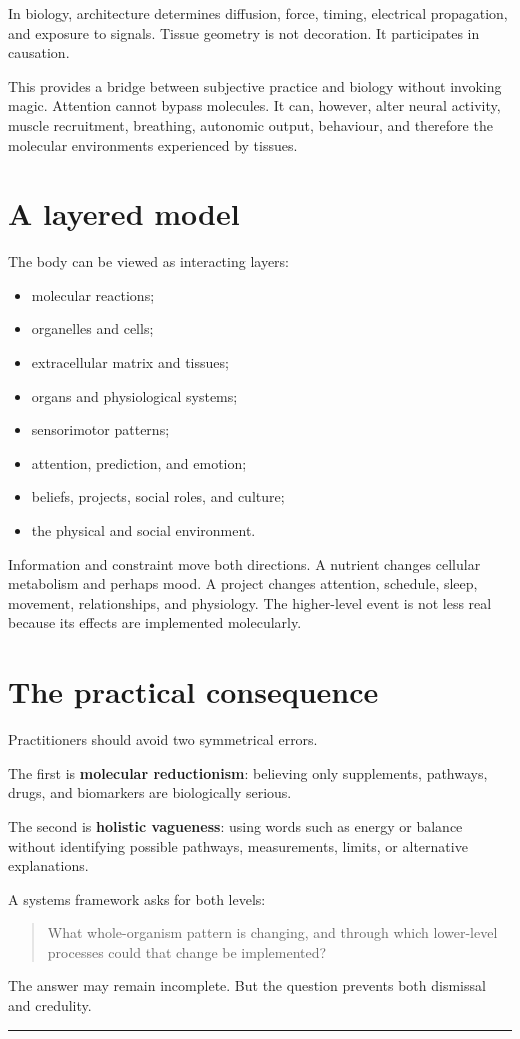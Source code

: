 In biology, architecture determines diffusion, force, timing, electrical propagation, and exposure to signals. Tissue geometry is not decoration. It participates in causation.

This provides a bridge between subjective practice and biology without invoking magic. Attention cannot bypass molecules. It can, however, alter neural activity, muscle recruitment, breathing, autonomic output, behaviour, and therefore the molecular environments experienced by tissues.

\section{A layered model}

The body can be viewed as interacting layers:

\begin{itemize}
\tightlist
\item
  molecular reactions;
\item
  organelles and cells;
\item
  extracellular matrix and tissues;
\item
  organs and physiological systems;
\item
  sensorimotor patterns;
\item
  attention, prediction, and emotion;
\item
  beliefs, projects, social roles, and culture;
\item
  the physical and social environment.
\end{itemize}

Information and constraint move both directions. A nutrient changes cellular metabolism and perhaps mood. A project changes attention, schedule, sleep, movement, relationships, and physiology. The higher-level event is not less real because its effects are implemented molecularly.

\section{The practical consequence}

Practitioners should avoid two symmetrical errors.

The first is \textbf{molecular reductionism}: believing only supplements, pathways, drugs, and biomarkers are biologically serious.

The second is \textbf{holistic vagueness}: using words such as energy or balance without identifying possible pathways, measurements, limits, or alternative explanations.

A systems framework asks for both levels:

\begin{quote}
What whole-organism pattern is changing, and through which lower-level processes could that change be implemented?
\end{quote}

The answer may remain incomplete. But the question prevents both dismissal and credulity.

\begin{center}\rule{0.5\linewidth}{0.5pt}\end{center}
